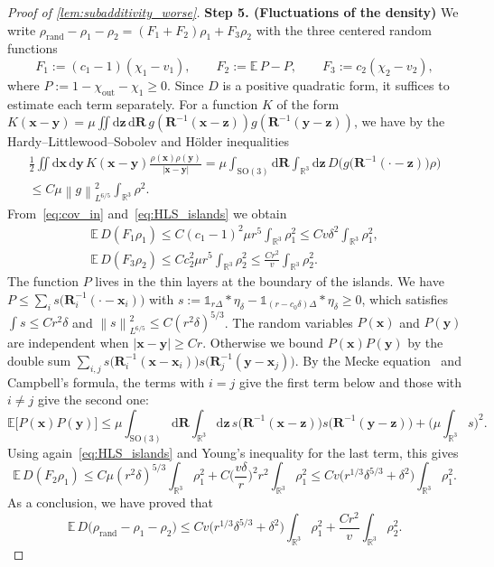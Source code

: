 \documentclass[final,reqno]{amsart}
\theoremstyle{remark}
\renewcommand{\le}{\leqslant}
\renewcommand{\ge}{\geqslant}
\newcommand{\RR}{\mathbb{R}}
\newcommand{\EE}{\mathbb{E}}
\newcommand{\SO}{\mathrm{SO}}
\newcommand{\norm}[1]{\left\| #1 \right\|}
\newcommand{\iden}{\mathbb{1}}
\newcommand{\tetra}{\mathbb{\Delta}}
\newcommand{\dd}{\mathrm{d}}
\begin{document}
\begin{proof}[Proof of \cref{lem:subadditivity_worse}]
\noindent\textbf{Step 5. (Fluctuations of the density)} We write $\rho_{\mathrm{rand}}-\rho_1-\rho_2=(F_1+F_2)\rho_1+F_3\rho_2$ with the three centered random functions
$$
F_1:=(c_1-1)(\chi_1-v_1),\qquad F_2:=\EE\,P-P,\qquad F_3:=c_2(\chi_2-v_2),
$$
where $P:=1-\chi_{\mathrm{out}}-\chi_1\ge0$. Since $D$ is a positive quadratic form, it suffices to estimate each term separately. For a function $K$ of the form $K(\mathbf{x}-\mathbf{y})=\mu\iint\dd\mathbf{z}\,\dd\mathbf{R}\,g(\mathbf{R}^{-1}(\mathbf{x}-\mathbf{z}))g(\mathbf{R}^{-1}(\mathbf{y}-\mathbf{z}))$, we have by the Hardy--Littlewood--Sobolev and H\"older inequalities
\begin{multline}\label{eq:HLS_islands}
\frac12\iint\dd\mathbf{x}\,\dd\mathbf{y}\,K(\mathbf{x}-\mathbf{y})\frac{\rho(\mathbf{x})\rho(\mathbf{y})}{|\mathbf{x}-\mathbf{y}|}=\mu\int_{\SO(3)}\dd\mathbf{R}\int_{\RR^3}\dd\mathbf{z}\,D\Big(g\big(\mathbf{R}^{-1}(\cdot-\mathbf{z})\big)\rho\Big)\\
\le C\mu\norm{g}_{L^{6/5}}^2\int_{\RR^3}\rho^2.
\end{multline}
From~\cref{eq:cov_in} and~\cref{eq:HLS_islands} we obtain
\begin{gather*}
\EE\,D(F_1\rho_1)\le C(c_1-1)^2\mu r^5\int_{\RR^3}\rho_1^2\le Cv\delta^2\int_{\RR^3}\rho_1^2,\\
\EE\,D(F_3\rho_2)\le Cc_2^2\mu r^5\int_{\RR^3}\rho_2^2\le \frac{Cr^2}{v}\int_{\RR^3}\rho_2^2.
\end{gather*}
The function $P$ lives in the thin layers at the boundary of the islands. We have $P\le\sum_is\big(\mathbf{R}_i^{-1}(\cdot-\mathbf{x}_i)\big)$ with $s:=\iden_{r\tetra}\ast\eta_\delta-\iden_{(r-c_0\delta)\tetra}\ast\eta_\delta\ge0$, which satisfies $\int s\le Cr^2\delta$ and $\norm{s}_{L^{6/5}}^2\le C(r^2\delta)^{5/3}$. The random variables $P(\mathbf{x})$ and $P(\mathbf{y})$ are independent when $|\mathbf{x}-\mathbf{y}|\ge Cr$. Otherwise we bound $P(\mathbf{x})P(\mathbf{y})$ by the double sum $\sum_{i,j}s\big(\mathbf{R}_i^{-1}(\mathbf{x}-\mathbf{x}_i)\big)s\big(\mathbf{R}_j^{-1}(\mathbf{y}-\mathbf{x}_j)\big)$. By the Mecke equation~\cite{last2017lectures} and Campbell's formula, the terms with $i=j$ give the first term below and those with $i\neq j$ give the second one:
$$
\EE\big[P(\mathbf{x})P(\mathbf{y})\big]\le\mu\int_{\SO(3)}\dd\mathbf{R}\int_{\RR^3}\dd\mathbf{z}\,s\big(\mathbf{R}^{-1}(\mathbf{x}-\mathbf{z})\big)s\big(\mathbf{R}^{-1}(\mathbf{y}-\mathbf{z})\big)+\Big(\mu\int_{\RR^3}s\Big)^2.
$$
Using again~\cref{eq:HLS_islands} and Young's inequality for the last term, this gives
$$
\EE\,D(F_2\rho_1)\le C\mu(r^2\delta)^{5/3}\int_{\RR^3}\rho_1^2+C\Big(\frac{v\delta}{r}\Big)^2r^2\int_{\RR^3}\rho_1^2\le Cv\big(r^{1/3}\delta^{5/3}+\delta^2\big)\int_{\RR^3}\rho_1^2.
$$
As a conclusion, we have proved that
\begin{equation}\label{eq:mixing_islands}
\EE\,D\big(\rho_{\mathrm{rand}}-\rho_1-\rho_2\big)\le Cv\big(r^{1/3}\delta^{5/3}+\delta^2\big)\int_{\RR^3}\rho_1^2+\frac{Cr^2}{v}\int_{\RR^3}\rho_2^2.
\end{equation}


\end{proof}
\end{document}
